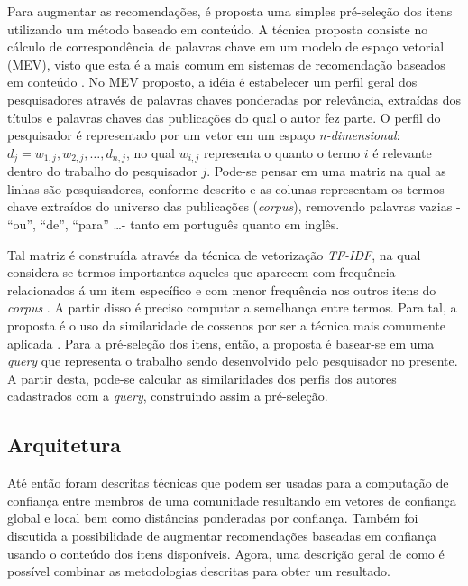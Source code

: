\documentclass[12pt]{article}
\begin{document}
Para augmentar as recomendações, é proposta uma simples pré-seleção dos itens utilizando um método baseado em conteúdo. A 
técnica proposta consiste no cálculo de correspondência de palavras chave em um modelo de espaço vetorial (MEV), visto que 
esta é a mais comum em sistemas de recomendação baseados em conteúdo \cite{ricci2011introduction}. No MEV proposto, a idéia é estabelecer um 
perfil geral dos pesquisadores através de palavras chaves ponderadas por relevância, extraídas dos títulos e palavras chaves 
das publicações do qual o autor fez parte. O perfil do pesquisador é representado por um vetor em um espaço \textit{n-dimensional}: 
$d_j = {w_{1,j}, w_{2,j}, \dots ,d_{n,j}}$, no qual $w_{i,j}$ representa o quanto o termo $i$ é relevante dentro do trabalho do 
pesquisador $j$. Pode-se pensar em uma matriz na qual as linhas são pesquisadores, conforme descrito e as colunas representam os 
termos-chave extraídos do universo das publicações (\textit{corpus}), removendo palavras vazias - “ou”, “de”, “para” \dots - 
tanto em português quanto em inglês.

Tal matriz é construída através da técnica de vetorização \textit{TF-IDF}, na qual considera-se termos importantes aqueles que 
aparecem com frequência relacionados á um item específico e com menor frequência nos outros itens do \textit{corpus} 
\cite{pazzani2007content}. A partir disso é preciso computar a semelhança entre termos. Para tal, a proposta é o uso da 
similaridade de cossenos por ser a técnica mais comumente aplicada \cite{ricci2011introduction}. Para a pré-seleção dos itens, então, a 
proposta é basear-se em uma \textit{query} que representa o trabalho sendo desenvolvido pelo pesquisador no presente. A partir 
desta, pode-se calcular as similaridades dos perfis dos autores cadastrados com a \textit{query}, construindo assim a pré-seleção.

\subsection{Arquitetura} \label{sect:arch}

Até então foram descritas técnicas que podem ser usadas para a computação de confiança entre membros de uma comunidade resultando 
em vetores de confiança global e local bem como distâncias ponderadas por confiança. Também foi discutida a possibilidade de 
augmentar recomendações baseadas em confiança usando o conteúdo dos itens disponíveis. Agora, uma descrição geral de como é 
possível combinar as metodologias descritas para obter um resultado. 
\end{document}
